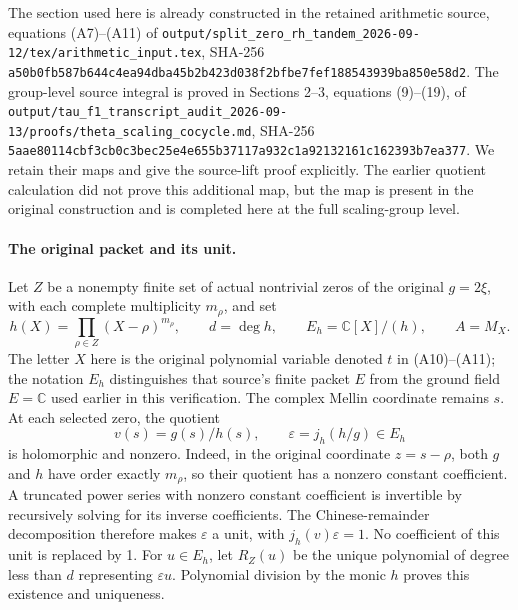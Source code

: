 \documentclass[10pt,a4paper,oneside]{report}
\begin{document}
The section used here is already constructed in the retained arithmetic
source, equations (A7)--(A11) of
\nolinkurl{output/split_zero_rh_tandem_2026-09-12/tex/arithmetic_input.tex},
SHA-256
\texttt{a50b0fb5\allowbreak{}87b644c4\allowbreak{}ea94dba4\allowbreak{}5b2b423d\allowbreak{}038f2bfb\allowbreak{}e7fef188\allowbreak{}543939ba\allowbreak{}850e58d2}.
The group-level source integral is proved in Sections 2--3, equations
(9)--(19), of
\nolinkurl{output/tau_f1_transcript_audit_2026-09-13/proofs/theta_scaling_cocycle.md},
SHA-256
\texttt{5aae8011\allowbreak{}4cbf3cb0\allowbreak{}c3bec25e\allowbreak{}4e655b37\allowbreak{}117a932c\allowbreak{}1a921321\allowbreak{}61c16239\allowbreak{}3b7ea377}.
We retain their maps and give the source-lift proof explicitly. The earlier
quotient calculation did not prove this additional map, but the map is
present in the original construction and is completed here at the full
scaling-group level.

\paragraph{The original packet and its unit.}
Let \(Z\) be a nonempty finite set of actual nontrivial zeros of the
original \(g=2\xi\), with each complete multiplicity \(m_\rho\), and set
\[
 h(X)=\prod_{\rho\in Z}(X-\rho)^{m_\rho},\qquad
 d=\deg h,\qquad E_h=\mathbb C[X]/(h),\qquad A=M_X.
\]
The letter \(X\) here is the original polynomial variable denoted \(t\)
in (A10)--(A11); the notation \(E_h\) distinguishes that source's finite
packet \(E\) from the ground field \(E=\mathbb C\) used earlier in this
verification. The complex Mellin coordinate remains \(s\). At each selected
zero, the quotient
\[
 v(s)=g(s)/h(s),\qquad \varepsilon=j_h(h/g)\in E_h
\]
is holomorphic and nonzero. Indeed, in the original coordinate
\(z=s-\rho\), both \(g\) and \(h\) have order exactly \(m_\rho\), so their
quotient has a nonzero constant coefficient. A truncated power series with
nonzero constant coefficient is invertible by recursively solving for
its inverse coefficients. The Chinese-remainder decomposition therefore
makes \(\varepsilon\) a unit, with
\(j_h(v)\varepsilon=1\). No coefficient of this unit is replaced by 1.
For \(u\in E_h\), let \(R_Z(u)\) be the unique polynomial of degree less
than \(d\) representing \(\varepsilon u\). Polynomial division by the
monic \(h\) proves this existence and uniqueness.
\end{document}
